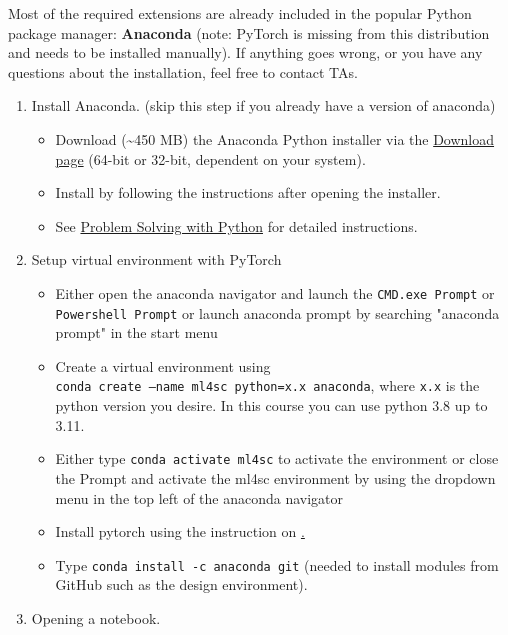 \documentclass[a4paper]{article}
\begin{document}
Most of the required extensions are already included in the popular Python package manager: \textbf{Anaconda} (note: PyTorch is missing from this distribution and needs to be installed manually). If anything goes wrong, or you have any questions about the installation, feel free to contact TAs.
\begin{enumerate}[label=\arabic*.]
    \item Install Anaconda. (skip this step if you already have a version of anaconda)
        \begin{itemize}
            \item Download (\textasciitilde 450 MB) the Anaconda Python installer via the \href{https://www.anaconda.com/download}{Download page} (64-bit or 32-bit, dependent on your system).
            \item Install by following the instructions after opening the installer.
            \item See \href{https://problemsolvingwithpython.com/01-Orientation/01.03-Installing-Anaconda-on-Windows/}{Problem Solving with Python} for detailed instructions.
        \end{itemize}
    \item Setup virtual environment with PyTorch
        \begin{itemize}
            \item Either open the anaconda navigator and launch the \texttt{CMD.exe Prompt} or \texttt {Powershell Prompt} or launch anaconda prompt by searching "anaconda prompt" in the start menu
            \item Create a virtual environment using \\
                  \texttt{conda create --name ml4sc python=x.x anaconda}, where \texttt{x.x} is the python version you desire. In this course you can use python 3.8 up to 3.11.
            \item Either type \texttt{conda activate ml4sc} to activate the environment or close the Prompt and activate the ml4sc environment by using the dropdown menu in the top left of the anaconda navigator
            \item Install pytorch using the instruction on \href{https://pytorch.org/get-started/locally/}. 
            \item Type \texttt{conda install -c anaconda git} (needed to install modules from GitHub such as the design environment).
        \end{itemize}
    \item Opening a notebook.

\end{enumerate}
\end{document}
